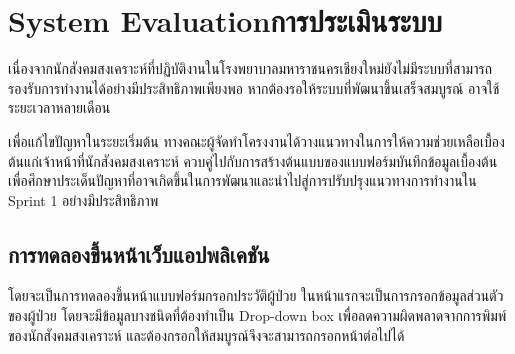 \chapter{\ifproject%
\ifenglish System Evaluation\else การประเมินระบบ\fi
\fi}

เนื่องจากนักสังคมสงเคราะห์ที่ปฏิบัติงานในโรงพยาบาลมหาราชนครเชียงใหม่ยังไม่มีระบบที่สามารถรองรับการทำงานได้อย่างมีประสิทธิภาพเพียงพอ หากต้องรอให้ระบบที่พัฒนาขึ้นเสร็จสมบูรณ์ อาจใช้ระยะเวลาหลายเดือน

เพื่อแก้ไขปัญหาในระยะเริ่มต้น ทางคณะผู้จัดทำโครงงานได้วางแนวทางในการให้ความช่วยเหลือเบื้องต้นแก่เจ้าหน้าที่นักสังคมสงเคราะห์ ควบคู่ไปกับการสร้างต้นแบบของแบบฟอร์มบันทึกข้อมูลเบื้องต้น เพื่อศึกษาประเด็นปัญหาที่อาจเกิดขึ้นในการพัฒนาและนำไปสู่การปรับปรุงแนวทางการทำงานใน Sprint 1 อย่างมีประสิทธิภาพ

\section{การทดลองขึ้นหน้าเว็บแอปพลิเคชัน}

โดยจะเป็นการทดลองขึ้นหน้าแบบฟอร์มกรอกประวัติผู้ป่วย ในหน้าแรกจะเป็นการกรอกข้อมูลส่วนตัวของผู้ป่วย โดยจะมีข้อมูลบางชนิดที่ต้องทำเป็น Drop-down box เพื่อลดความผิดพลาดจากการพิมพ์ของนักสังคมสงเคราะห์ และต้องกรอกให้สมบูรณ์จึงจะสามารถกรอกหน้าต่อไปได้

